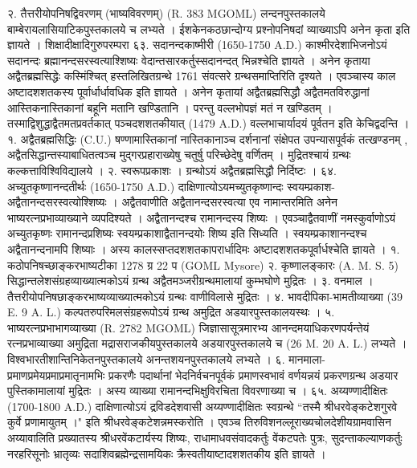 २. तैत्तरीयोपनिषद्विवरणम् (भाष्यविवरणम्) (R. 383 MGOML) लन्दनपुस्तकालये बाम्बेरायलासियाटिकपुस्तकालये च लभ्यते । ईशकेनकठछान्दोग्य प्रश्नोपनिषदां व्याख्याऽपि अनेन कृता इति ज्ञायते ।
शिक्षादीक्षादिगुरुपरम्परा
६३. सदानन्दकाष्मीरी (1650-1750 A.D.)
काश्मीरदेशाभिजनोऽयं सदानन्दः ब्रह्मानन्दसरस्वत्याश्शिष्यः वेदान्तसारकर्तुस्सदानन्दत् भिन्नश्चेति ज्ञायते । अनेन कृताया अद्वैतब्रह्मसिद्धेः कस्मिंश्चित् हस्तलिखितग्रन्थे 1761 संवत्सरे ग्रन्थसमाप्तिरिति दृश्यते । एवञ्चास्य काल अष्टादशशतकस्य पूर्वार्धार्धावधिक इति ज्ञायते ।
अनेन कृतायां अद्वैतब्रह्मसिद्धौ अद्वैतमतविरुद्धानां आस्तिकनास्तिकानां बहूनि मतानि खण्डितानि । परन्तु वल्लभोपज्ञं मतं न खण्डितम् । तस्माद्विशुद्धाद्वैतमतप्रवर्तकात् पञ्चदशशतकीयात् (1479 A.D.) वल्लभाचार्यादयं पूर्वतन इति केचिद्वदन्ति ।
१. अद्वैतब्रह्मसिद्धिः (C.U.)
षण्णामास्तिकानां नास्तिकानाञ्च दर्शनानां संक्षेपत उपन्यासपूर्वकं तत्खण्डनम् , अद्वैतसिद्धान्तस्याबाधितत्वञ्च मुद्गरप्रहाराख्येषु चतुर्षु परिच्छेदेषु वर्णितम् । मुद्रितश्चायं ग्रन्थः कल्कत्ताविश्विविद्यालये ।
२. स्वरूपप्रकाशः । ग्रन्थोऽयं अद्वैतब्रह्मसिद्धौ निर्दिष्टः ।
६४. अच्युतकृष्णानन्दतीर्थः (1650-1750 A.D.)
दाक्षिणात्योऽयमच्युतकृष्णान्दः स्वयम्प्रकाश-अद्वैतानन्दसरस्वत्योश्शिष्यः । अद्वैतवाणीति अद्वैतानन्दसरस्वत्या एव नामान्तरमिति अनेन भाष्यरत्नप्रभाव्याख्याने व्यपदिश्यते । अद्वैतानन्दश्च रामानन्दस्य शिष्यः । एवञ्चाद्वैतवाणीं नमस्कुर्वाणोऽयं अच्युतकृष्णः रामानन्दप्रशिष्यः स्वयम्प्रकाशाद्वैतानन्दयोः शिष्य इति सिध्यति । स्वयम्प्रकाशानन्दश्च अद्वैतानन्दनामपि शिष्याः । अस्य कालस्सप्तदशशतकापरार्धादिमः अष्टादशशतकपूर्वार्धश्चेति ज्ञायते ।
१. कठोपनिषच्छाङ्करभाष्यटीका 1278 ग्र 22 प (GOML Mysore)
२. कृष्णालङ्कारः (A. M. S. 5)
सिद्धान्तलेशसंग्रहव्याख्यात्मकोऽयं ग्रन्थ अद्वैतमञ्जरीग्रन्थमालायां कुम्भघोणे मुद्रितः ।
३. वनमाल । तैत्तरीयोपनिषछाङ्करभाष्यव्याख्यात्मकोऽयं ग्रन्थः वाणीविलासे मुद्रितः ।
४. भावदीपिका-भामतीव्याख्या (39 E. 9 A. L.)
कल्पतरुपरिमलसंग्रहरूपोऽयं ग्रन्थ अमुद्रित अडयारपुस्तकालयस्थः ।
५. भाष्यरत्नप्रभाभागव्याख्या (R. 2782 MGOML)
जिज्ञासासूत्रमारभ्य आनन्दमयाधिकरणपर्यन्तेयं रत्नप्रभाव्याख्या अमुद्रिता मद्रासराजकीयपुस्तकालये अडयारपुस्तकालये च (26 M. 20 A. L.) लभ्यते । विश्वभारतीशान्तिनिकेतनपुस्तकालये अनन्तशयनपुस्तकालये लभ्यते ।
६. मानमाला-
प्रमाणप्रमेयप्रमाप्रमातृनामभिः प्रकरणैः पदार्थानां भेदनिर्वचनपूर्वकं प्रमाणस्वभावं वर्णयन्नयं प्रकरणग्रन्थ अडयार पुस्तिकामालायां मुद्रितः । अस्य व्याख्या रामानन्दभिक्षुविरचिता विवरणाख्या च ।
६५. अय्यण्णादीक्षितः (1700-1800 A.D.)
दाक्षिणात्योऽयं द्रविडदेशवासी अय्यण्णादीक्षितः स्वग्रन्थे ``तस्मै श्रीधरवेङ्कटेशगुरवे कुर्वे प्रणामायुतम् ।" इति श्रीधरवेङ्कटेशन्नमस्करोति । एवञ्च तिरुविशनल्लूराख्यचोलदेशीयग्रामवासिन अय्यावालिति प्रख्यातस्य श्रीधरवेंकटार्यस्य शिष्यः, राधामाधवसंवादकर्तुः वेंकटपतेः पुत्रः, सुदन्ताकल्याणकर्तुः नरहरिसूनोः भ्रातृव्यः सदाशिवब्रह्मेन्द्रसामयिकः क्रैस्वतीयाष्टादशशतकीय इति ज्ञायते ।

